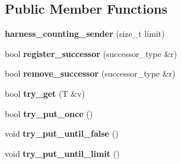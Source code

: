 \subsection*{Public Member Functions}
\begin{DoxyCompactItemize}
\item 
\hypertarget{structharness__counting__sender_a81ed0e41dd400629cfe35b195d24a1dc}{}{\bfseries harness\+\_\+counting\+\_\+sender} (size\+\_\+t limit)\label{structharness__counting__sender_a81ed0e41dd400629cfe35b195d24a1dc}

\item 
\hypertarget{structharness__counting__sender_a30584d64385152fabf6559ad687ed447}{}bool {\bfseries register\+\_\+successor} (successor\+\_\+type \&r)\label{structharness__counting__sender_a30584d64385152fabf6559ad687ed447}

\item 
\hypertarget{structharness__counting__sender_a2771329509d72ca42e93694e8802c415}{}bool {\bfseries remove\+\_\+successor} (successor\+\_\+type \&r)\label{structharness__counting__sender_a2771329509d72ca42e93694e8802c415}

\item 
\hypertarget{structharness__counting__sender_a783867b30c65cdd280f51b99eec7dcf2}{}bool {\bfseries try\+\_\+get} (T \&v)\label{structharness__counting__sender_a783867b30c65cdd280f51b99eec7dcf2}

\item 
\hypertarget{structharness__counting__sender_afac56be0e014c8276714f61840a22ac0}{}bool {\bfseries try\+\_\+put\+\_\+once} ()\label{structharness__counting__sender_afac56be0e014c8276714f61840a22ac0}

\item 
\hypertarget{structharness__counting__sender_afa17253c96f035c450d33281c4e8fc66}{}void {\bfseries try\+\_\+put\+\_\+until\+\_\+false} ()\label{structharness__counting__sender_afa17253c96f035c450d33281c4e8fc66}

\item 
\hypertarget{structharness__counting__sender_a9e9a671123c7d8156b9634ae4ba04e54}{}void {\bfseries try\+\_\+put\+\_\+until\+\_\+limit} ()\label{structharness__counting__sender_a9e9a671123c7d8156b9634ae4ba04e54}

\end{DoxyCompactItemize}
